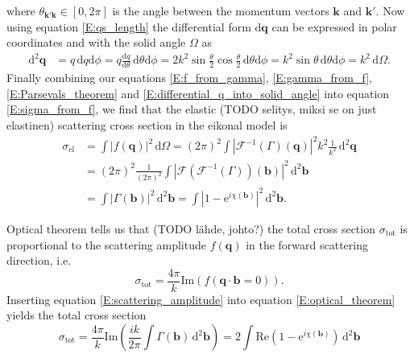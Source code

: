 \documentclass[a4paper, twoside, english, 12pt]{article}
\begin{document}
where $\theta_{\mathbf{k'}\mathbf{k}} \in \left[0,2\pi\right]$ is the angle between the momentum vectors $\mathbf{k}$ and $\mathbf{k'}$. Now using equation \eqref{E:qs_length} the differential form $\text{d}\mathbf{q}$ can be expressed in polar coordinates and with the solid angle $\Omega$ as
\begin{align}\label{E:differential_q_into_solid_angle}
\text{d}^2\mathbf{q} &= q\,\text{d}q\text{d}\phi = q\frac{\text{d}q}{\text{d}\theta}\,\text{d}\theta\text{d}\phi = 2k^2\sin\frac{\theta}{2}\cos\frac{\theta}{2} \,\text{d}\theta\text{d}\phi = k^2\sin\theta \,\text{d}\theta\text{d}\phi = k^2\,\text{d}\Omega.
\end{align}
Finally combining our equations \eqref{E:f_from_gamma}, \eqref{E:gamma_from_f}, \eqref{E:Parsevals_theorem} and \eqref{E:differential_q_into_solid_angle} into equation \eqref{E:sigma_from_f}, we find that the elastic (TODO selitys, miksi se on just elastinen) scattering cross section in the eikonal model is
\begin{align}\label{E:sigma_el_from_profile}
	\sigma_{\text{el}} &= \int \left|f(\mathbf{q})\right|^2 \, \text{d}\Omega = (2\pi)^2 \int \left|\mathcal{F}^{-1}(\Gamma)(\mathbf{q})\right|^2 k^2\frac{1}{k^2}\, \text{d}^2\mathbf{q} \nonumber \\
	&= (2\pi)^2 \frac{1}{(2\pi)^2} \int \left|\mathcal{F}\left(\mathcal{F}^{-1}(\Gamma)\right)(\mathbf{b})\right|^2 \, \text{d}^2\mathbf{b}  \nonumber \\
	&= \int \left|\Gamma(\mathbf{b}) \right|^2 \, \text{d}^2\mathbf{b} = \int \left|1-\text{e}^{i\chi(\mathbf{b})} \right|^2 \, \text{d}^2\mathbf{b}.
\end{align}

Optical theorem tells us that (TODO lähde, johto?) the total cross section $\sigma_\text{tot}$ is proportional to the scattering amplitude $f(\mathbf{q})$ in the forward scattering direction, i.e.
\begin{equation}\label{E:optical_theorem}
	\sigma_\text{tot} = \frac{4\pi}{k} \text{Im}\left(f(\mathbf{q}\cdot\mathbf{b}=0)\right).
\end{equation}
Inserting equation \eqref{E:scattering_amplitude} into equation \eqref{E:optical_theorem} yields the total cross section
\begin{equation}\label{E:sigma_tot_from_profile}
\sigma_\text{tot} = \frac{4\pi}{k} \text{Im}\left(\frac{ik}{2\pi}\int \Gamma(\mathbf{b}) \,\text{d}^2\mathbf{b}\right) = 2\int \text{Re}\left(1 - \text{e}^{i\chi(\mathbf{b})}\right) \,\text{d}^2\mathbf{b}
\end{equation}
\end{document}
